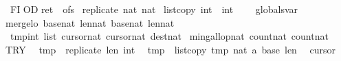 \begin{isabellebody}
\ FI\isanewline
OD{\isacharsemicolon}{\isacharsemicolon}\isanewline
{\isasymacute}ret\ {\isacharcolon}{\isacharequal}{\isacharequal}\ {\isasymacute}ofs\isanewline
{\isachardoublequoteclose}\isanewline
\isanewline
\isanewline
{}\isamarkupfalse%
\ {\isachardoublequoteopen}replicate\ {\isacharparenleft}{}{\isacharcolon}{\isacharcolon}nat{\isacharparenright}\ {\isacharparenleft}{}{\isacharcolon}{\isacharcolon}nat{\isacharparenright}{\isachardoublequoteclose}\isanewline
{}\isamarkupfalse%
\ {\isachardoublequoteopen}list{\isacharunderscore}copy\ {\isacharbrackleft}{}{\isacharcomma}{}{\isacharcomma}{}{\isacharcolon}{\isacharcolon}int{\isacharbrackright}\ {}\ {\isacharbrackleft}{}{\isacharcomma}{}{\isacharcomma}{}{\isacharcolon}{\isacharcolon}int{\isacharbrackright}\ {}\ {}{\isachardoublequoteclose}\isanewline
{}\isamarkupfalse%
\ {\isacharparenleft}\ globals{\isacharunderscore}var{\isacharparenright}\isanewline
merge{\isacharunderscore}lo\ {\isacharparenleft}base{}{\isacharcolon}{\isacharcolon}nat{\isacharcomma}\ len{}{\isacharcolon}{\isacharcolon}nat{\isacharcomma}\ base{}{\isacharcolon}{\isacharcolon}nat{\isacharcomma}\ len{}{\isacharcolon}{\isacharcolon}nat{\isacharparenright}\isanewline
{}\ tmp{\isacharcolon}{\isacharcolon}{\isachardoublequoteopen}int\ list{\isachardoublequoteclose}\ cursor{}{\isacharcolon}{\isacharcolon}nat\ cursor{}{\isacharcolon}{\isacharcolon}nat\ dest{\isacharcolon}{\isacharcolon}nat\ \isanewline
min{\isacharunderscore}gallop{\isacharcolon}{\isacharcolon}nat\ count{}{\isacharcolon}{\isacharcolon}nat\ count{}{\isacharcolon}{\isacharcolon}nat\ \isanewline
{\isachardoublequoteopen}\isanewline
TRY\isanewline
\ \ {\isasymacute}tmp\ {\isacharcolon}{\isacharequal}{\isacharequal}\ replicate\ {\isasymacute}len{}\ {\isacharparenleft}{}{\isacharcolon}{\isacharcolon}int{\isacharparenright}{\isacharsemicolon}{\isacharsemicolon}\isanewline
\ \ {\isasymacute}tmp\ {\isacharcolon}{\isacharequal}{\isacharequal}\ list{\isacharunderscore}copy\ {\isasymacute}tmp\ {\isacharparenleft}{}{\isacharcolon}{\isacharcolon}nat{\isacharparenright}\ {\isasymacute}a\ {\isasymacute}base{}\ {\isasymacute}len{}{\isacharsemicolon}{\isacharsemicolon}\isanewline
\ \ {\isasymacute}cursor{}\ {\isacharcolon}{\isacharequal}{\isacharequal}\ {}{\isacharsemicolon}{\isacharsemicolon}\isanewline

\end{isabellebody}
